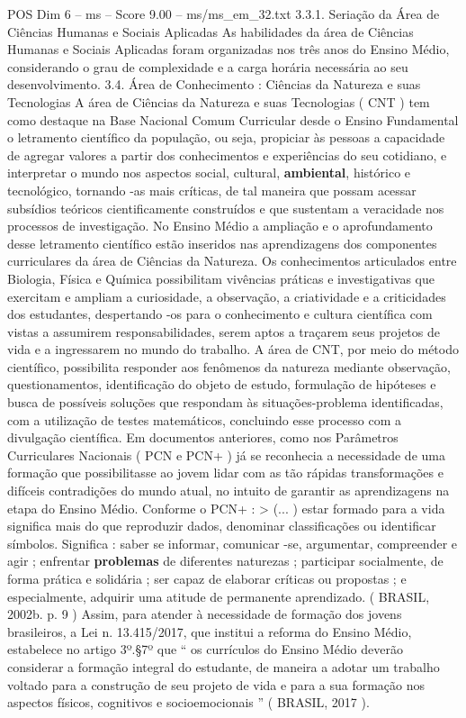 \begin{textsample}{POS Dim 6 – ms – Score 9.00 – ms/ms\_em\_32.txt}  \label{ex:f6_pos_055}
3.3.1.
Seriação da Área de Ciências Humanas e Sociais Aplicadas As habilidades da área de Ciências Humanas e Sociais Aplicadas foram organizadas nos três anos do Ensino Médio, considerando o grau de complexidade e a carga horária necessária ao seu desenvolvimento. 3.4.
Área de Conhecimento : Ciências da Natureza e suas Tecnologias A área de Ciências da Natureza e suas Tecnologias ( CNT ) tem como destaque na Base Nacional Comum Curricular desde o Ensino Fundamental o letramento científico da população, ou seja, propiciar às pessoas a capacidade de agregar valores a partir dos conhecimentos e experiências do seu cotidiano, e interpretar o mundo nos aspectos social, cultural, \textbf{ambiental}, histórico e tecnológico, tornando -as mais críticas, de tal maneira que possam acessar subsídios teóricos cientificamente construídos e que sustentam a veracidade nos processos de investigação.
No Ensino Médio a ampliação e o aprofundamento desse letramento científico estão inseridos nas aprendizagens dos componentes curriculares da área de Ciências da Natureza.
Os conhecimentos articulados entre Biologia, Física e Química possibilitam vivências práticas e investigativas que exercitam e ampliam a curiosidade, a observação, a criatividade e a criticidades dos estudantes, despertando -os para o conhecimento e cultura científica com vistas a assumirem responsabilidades, serem aptos a traçarem seus projetos de vida e a ingressarem no mundo do trabalho.
A área de CNT, por meio do método científico, possibilita responder aos fenômenos da natureza mediante observação, questionamentos, identificação do objeto de estudo, formulação de hipóteses e busca de possíveis soluções que respondam às situações-problema identificadas, com a utilização de testes matemáticos, concluindo esse processo com a divulgação científica.
Em documentos anteriores, como nos Parâmetros Curriculares Nacionais ( PCN e PCN+ ) já se reconhecia a necessidade de uma formação que possibilitasse ao jovem lidar com as tão rápidas transformações e difíceis contradições do mundo atual, no intuito de garantir as aprendizagens na etapa do Ensino Médio.
Conforme o PCN+ : > (... ) estar formado para a vida significa mais do que reproduzir dados, denominar classificações ou identificar símbolos.
Significa : saber se informar, comunicar -se, argumentar, compreender e agir ; enfrentar \textbf{problemas} de diferentes naturezas ; participar socialmente, de forma prática e solidária ; ser capaz de elaborar críticas ou propostas ; e especialmente, adquirir uma atitude de permanente aprendizado. ( BRASIL, 2002b. p. 9 ) Assim, para atender à necessidade de formação dos jovens brasileiros, a Lei n. 13.415/2017, que institui a reforma do Ensino Médio, estabelece no artigo 3º.§7º que “ os currículos do Ensino Médio deverão considerar a formação integral do estudante, de maneira a adotar um trabalho voltado para a construção de seu projeto de vida e para a sua formação nos aspectos físicos, cognitivos e socioemocionais ” ( BRASIL, 2017 ).

\end{textsample}
